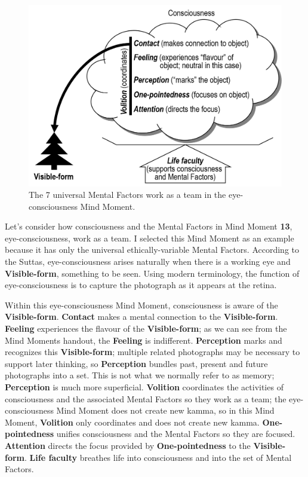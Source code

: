 \begin{figure}[H]
\centering
\includegraphics[width=0.7\linewidth]{./Diagrams/Eye-cons}
\caption{The 7 universal Mental Factors work as a team in the eye-consciousness Mind Moment.}
\label{fig:Eye-cons}
\end{figure}

Let’s consider how consciousness and the Mental Factors in Mind Moment \textbf{13}, eye-consciousness, work as a team. I selected this Mind Moment as an example because it has only the universal ethically-variable Mental Factors. According to the Suttas, eye-consciousness arises naturally when there is a working eye and \textbf{Visible-form}, something to be seen. Using modern terminology, the function of eye-consciousness is to capture the photograph as it appears at the retina.

Within this eye-consciousness Mind Moment, consciousness is aware of the \textbf{Visible-form}. \textbf{Contact} makes a mental connection to the \textbf{Visible-form}. \textbf{Feeling} experiences the flavour of the \textbf{Visible-form}; as we can see from the Mind Moments handout, the \textbf{Feeling} is indifferent. \textbf{Perception} marks and recognizes this \textbf{Visible-form}; multiple related photographs may be necessary to support later thinking, so \textbf{Perception} bundles past, present and future photographs into a set. This is not what we normally refer to as memory; \textbf{Perception} is much more superficial. \textbf{Volition} coordinates the activities of consciousness and the associated Mental Factors so they work as a team; the eye-consciousness Mind Moment does not create new kamma, so in this Mind Moment, \textbf{Volition} only coordinates and does not create new kamma. \textbf{One-pointedness} unifies consciousness and the Mental Factors so they are focused. \textbf{Attention} directs the focus provided by \textbf{One-pointedness} to the \textbf{Visible-form}. \textbf{Life faculty} breathes life into consciousness and into the set of Mental Factors.

